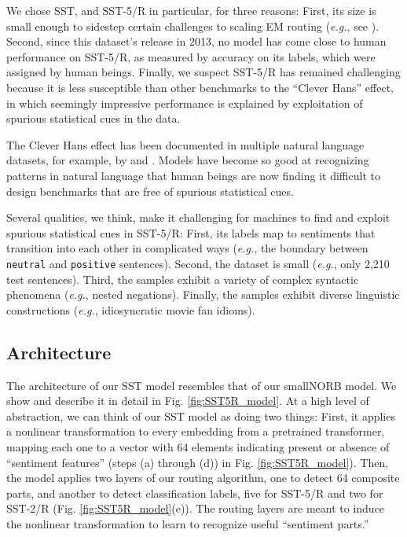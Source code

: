 \documentclass[11pt,a4paper]{article}
\begin{document}
We chose SST, and SST-5/R in particular, for three reasons: First, its size is small enough to sidestep certain challenges to scaling EM routing ({\em e.g.}, see \citet{Barham:2019:MLS:3317550.3321441}). Second, since this dataset's release in 2013, no model has come close to human performance on SST-5/R, as measured by accuracy on its labels, which were assigned by human beings. Finally, we suspect SST-5/R has remained challenging because it is less susceptible than other benchmarks to the ``Clever Hans'' effect, in which seemingly impressive performance is explained by exploitation of spurious statistical cues in the data.

The Clever Hans effect has been documented in multiple natural language datasets, for example, by \citet{mccoy-etal-2019-right} and \citet{DBLP:journals/corr/abs-1907-07355}. Models have become so good at recognizing patterns in natural language that human beings are now finding it difficult to design benchmarks that are free of spurious statistical cues.

Several qualities, we think, make it challenging for machines to find and exploit spurious statistical cues in SST-5/R: First, its labels map to sentiments that transition into each other in complicated ways ({\em e.g.}, the boundary between {\tt \small neutral} and {\tt \small positive} sentences). Second, the dataset is small ({\em e.g.}, only 2,210 test sentences). Third, the samples exhibit a variety of complex syntactic phenomena ({\em e.g.}, nested negations). Finally, the samples exhibit diverse linguistic constructions ({\em e.g.}, idiosyncratic movie fan idioms).

\subsection{Architecture}

The architecture of our SST model resembles that of our smallNORB model. We show and describe it in detail in Fig. \ref{fig:SST5R_model}. At a high level of abstraction, we can think of our SST model as doing two things: First, it applies a nonlinear transformation to every embedding from a pretrained transformer, mapping each one to a vector with 64 elements indicating present or absence of ``sentiment features'' (steps (a) through (d)) in Fig. \ref{fig:SST5R_model}). Then, the model applies two layers of our routing algorithm, one to detect 64 composite parts, and another to detect classification labels, five for SST-5/R and two for SST-2/R (Fig. \ref{fig:SST5R_model}(e)). The routing layers are meant to induce the nonlinear transformation to learn to recognize useful ``sentiment parts.''
\end{document}
